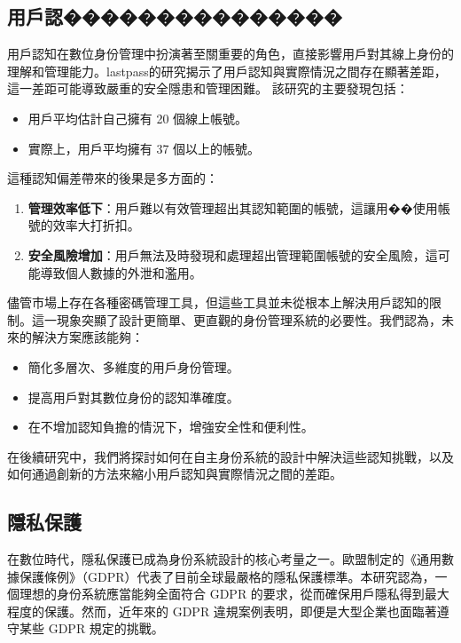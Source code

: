 \subsection{用戶認���������������}
用戶認知在數位身份管理中扮演著至關重要的角色，直接影響用戶對其線上身份的理解和管理能力。lastpass\cite{lastpass2020psychology}的研究揭示了用戶認知與實際情況之間存在顯著差距，這一差距可能導致嚴重的安全隱患和管理困難。\newline
該研究的主要發現包括：
\begin{itemize}
  \item 用戶平均估計自己擁有 20 個線上帳號。
  \item 實際上，用戶平均擁有 37 個以上的帳號。
\end{itemize}
這種認知偏差帶來的後果是多方面的：
\begin{enumerate}
  \item \textbf{管理效率低下}：用戶難以有效管理超出其認知範圍的帳號，這讓用��使用帳號的效率大打折扣。
  \item \textbf{安全風險增加}：用戶無法及時發現和處理超出管理範圍帳號的安全風險，這可能導致個人數據的外泄和濫用。
\end{enumerate}
儘管市場上存在各種密碼管理工具，但這些工具並未從根本上解決用戶認知的限制。這一現象突顯了設計更簡單、更直觀的身份管理系統的必要性。我們認為，未來的解決方案應該能夠：
\begin{itemize}
  \item 簡化多層次、多維度的用戶身份管理。
  \item 提高用戶對其數位身份的認知準確度。
  \item 在不增加認知負擔的情況下，增強安全性和便利性。
\end{itemize}
在後續研究中，我們將探討如何在自主身份系統的設計中解決這些認知挑戰，以及如何通過創新的方法來縮小用戶認知與實際情況之間的差距。
\subsection{隱私保護}
在數位時代，隱私保護已成為身份系統設計的核心考量之一。歐盟制定的《通用數據保護條例》（GDPR）代表了目前全球最嚴格的隱私保護標準。本研究認為，一個理想的身份系統應當能夠全面符合 GDPR 的要求，從而確保用戶隱私得到最大程度的保護。然而，近年來的 GDPR 違規案例表明，即便是大型企業也面臨著遵守某些 GDPR 規定的挑戰。

